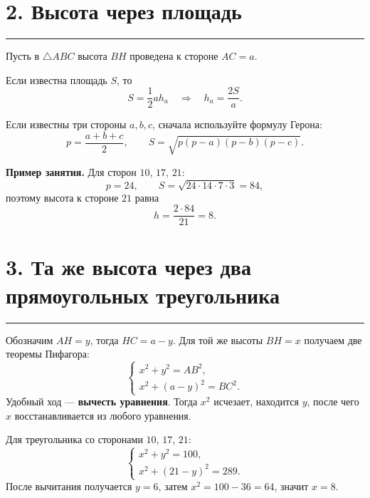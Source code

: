\documentclass[a4paper,12pt]{article}
\newcommand{\sectionline}{\par\vspace{0.2em}\noindent\color{rulegray}\rule{\linewidth}{0.6pt}\par\color{textgray}\vspace{0.45em}}
\newcommand{\key}[1]{\textcolor{darkaccent}{\textbf{#1}}}
\newcommand{\formula}[1]{\[\boxed{#1}\]}
\begin{document}
\section*{2. Высота через площадь}
\sectionline
Пусть в $\triangle ABC$ высота $BH$ проведена к стороне $AC=a$.

\begin{center}
\end{center}

Если известна площадь $S$, то
\formula{S=\frac12 a h_a \quad\Longrightarrow\quad h_a=\frac{2S}{a}.}

Если известны три стороны $a,b,c$, сначала используйте формулу Герона:
\formula{p=\frac{a+b+c}{2},\qquad S=\sqrt{p(p-a)(p-b)(p-c)}.}

\key{Пример занятия.} Для сторон $10$, $17$, $21$:
\[
p=24,\qquad S=\sqrt{24\cdot14\cdot7\cdot3}=84,
\]
поэтому высота к стороне $21$ равна
\[
h=\frac{2\cdot84}{21}=8.
\]

\section*{3. Та же высота через два прямоугольных треугольника}
\sectionline
Обозначим $AH=y$, тогда $HC=a-y$. Для той же высоты $BH=x$ получаем две теоремы Пифагора:
\[
\begin{cases}
x^2+y^2=AB^2,\\
x^2+(a-y)^2=BC^2.
\end{cases}
\]
Удобный ход --- \key{вычесть уравнения}. Тогда $x^2$ исчезает, находится $y$, после чего $x$ восстанавливается из любого уравнения.

Для треугольника со сторонами $10$, $17$, $21$:
\[
\begin{cases}
x^2+y^2=100,\\
x^2+(21-y)^2=289.
\end{cases}
\]
После вычитания получается $y=6$, затем $x^2=100-36=64$, значит $x=8$.
\end{document}

